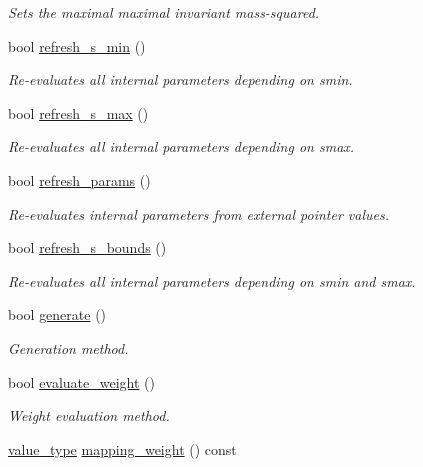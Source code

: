 \begin{DoxyCompactItemize}
\begin{DoxyCompactList}\small\item\em Sets the maximal maximal invariant mass-\/squared. \end{DoxyCompactList}\item 
bool \hyperlink{a00001_a3aea06461838774d655bd82c118c11e2}{refresh\-\_\-s\-\_\-min} ()
\begin{DoxyCompactList}\small\item\em Re-\/evaluates all internal parameters depending on smin. \end{DoxyCompactList}\item 
bool \hyperlink{a00001_a8bdc493b1ed0e29f9fc7ea0aa7e6e510}{refresh\-\_\-s\-\_\-max} ()
\begin{DoxyCompactList}\small\item\em Re-\/evaluates all internal parameters depending on smax. \end{DoxyCompactList}\item 
bool \hyperlink{a00001_af5f174e832ad6c23ecc49d4bc7018727}{refresh\-\_\-params} ()
\begin{DoxyCompactList}\small\item\em Re-\/evaluates internal parameters from external pointer values. \end{DoxyCompactList}\item 
bool \hyperlink{a00001_acccaf0f50a38cb1121bc4159e8a23ced}{refresh\-\_\-s\-\_\-bounds} ()
\begin{DoxyCompactList}\small\item\em Re-\/evaluates all internal parameters depending on smin and smax. \end{DoxyCompactList}\item 
\hypertarget{a00001_a67261f6037fcf42078efb5922eed328b}{bool \hyperlink{a00001_a67261f6037fcf42078efb5922eed328b}{generate} ()}\label{a00001_a67261f6037fcf42078efb5922eed328b}

\begin{DoxyCompactList}\small\item\em Generation method. \end{DoxyCompactList}\item 
\hypertarget{a00001_aa297a5927d2601b0aa2b2553c609e7ec}{bool \hyperlink{a00001_aa297a5927d2601b0aa2b2553c609e7ec}{evaluate\-\_\-weight} ()}\label{a00001_aa297a5927d2601b0aa2b2553c609e7ec}

\begin{DoxyCompactList}\small\item\em Weight evaluation method. \end{DoxyCompactList}\item 
\hypertarget{a00001_a0398fc3f8f98c02e7ecacd139da77ade}{\hyperlink{a00362_a3353150105036deac9bde097cbf1d8af}{value\-\_\-type} \hyperlink{a00001_a0398fc3f8f98c02e7ecacd139da77ade}{mapping\-\_\-weight} () const }\label{a00001_a0398fc3f8f98c02e7ecacd139da77ade}


\end{DoxyCompactItemize}
